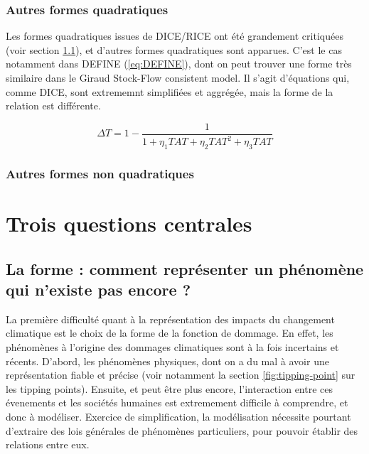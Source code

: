 \subsubsection{Autres formes quadratiques}

Les formes quadratiques issues de DICE/RICE ont été grandement critiquées (voir section \ref{ss:forme}), et d'autres formes quadratiques sont apparues. C'est le cas notamment dans DEFINE (\ref{eq:DEFINE}), dont on peut trouver une forme très similaire dans le Giraud Stock-Flow consistent model. Il s'agit d'équations qui, comme DICE, sont extrememnt simplifiées et aggrégée, mais la forme de la relation est différente. 

\begin{equation}
    \Delta T = 1 - \frac{1}{1 + \eta_1 TAT + \eta_2 TAT^2 + \eta_3 TAT}
    \label{eq:DEFINE}
\end{equation}

\subsubsection{Autres formes non quadratiques}



\section{Trois questions centrales}


\subsection{La forme : comment représenter un phénomène qui n'existe pas encore ?}
\label{ss:forme}

La première difficulté quant à la représentation des impacts du changement climatique est le choix de la forme de la fonction de dommage. En effet, les phénomènes à l'origine des dommages climatiques sont à la fois incertains et récents. D'abord, les phénomènes physiques, dont on a du mal à avoir une représentation fiable et précise (voir notamment la section \ref{fig:tipping-point} sur les tipping points). Ensuite, et peut être plus encore, l'interaction entre ces évenements et les sociétés humaines est extremement difficile à comprendre, et donc à modéliser. Exercice de simplification, la modélisation nécessite pourtant d'extraire des lois générales de phénomènes particuliers, pour pouvoir établir des relations entre eux. \\

